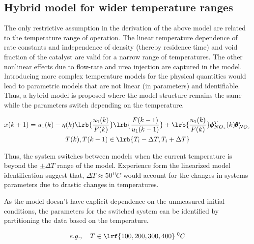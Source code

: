\subsection{Hybrid model for wider temperature ranges}

The only restrictive assumption in the derivation of the above model are related to the temperature range of operation.
The linear temperature dependence of rate constants and independence of density (thereby residence time) and void
fraction of the catalyst are valid for a narrow range of temperatures. The other nonlinear effects due to flow-rate and
urea injection are captured in the model. Introducing more complex temperature models for the physical quantities would
lead to parametric models that are not linear (in parameters) and identifiable. Thus, a hybrid model is proposed where
the model structure remains the same while the parameters switch depending on the temperature.

\begin{multline}
        x(k+1) = u_1(k) - \eta(k) \lrb{\frac{u_1(k)}{F(k)}} \lrb{\frac{F(k-1)}{u_1(k-1)}}
                        + \lrb{\frac{u_1(k)}{F(k)}} \pmb \phi^{T}_{NO_x}(k) \pmb \theta^i_{NO_x}
        \\
        T(k), T(k-1) \in \lrb{T_i-\Delta T, T_i + \Delta T}
\end{multline}

Thus, the system switches between models when the current temperature is beyond the $\pm \Delta T$ range of the model.
Experience form the linearized model identification suggest that, $\Delta T \approx 50 \, ^0C$ would account for
the changes in systems parameters due to drastic changes in temperatures.

As the model doesn't have explicit dependence on the unmeasured initial conditions, the parameters for the switched system can be identified by partitioning the data based on the temperature.

\begin{align}
        e.g., \quad T \in \lrf{100, 200, 300, 400} \; ^0C
\end{align}
